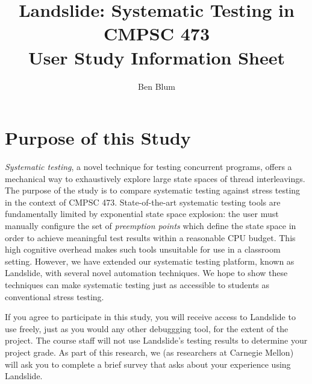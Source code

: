 \documentclass{article}
\begin{document}

\newcommand\classname{CMPSC 473}
\title{\bf Landslide: Systematic Testing in \classname \\ User Study Information Sheet}
\author{Ben Blum}
\date{}
\maketitle

\section{Purpose of this Study}

{\em Systematic testing}, a novel technique for testing concurrent programs, offers a mechanical way to exhaustively explore large state spaces of thread interleavings.
The purpose of the study is to compare systematic testing against stress testing in the context of \classname.
State-of-the-art systematic testing tools are fundamentally limited by exponential state space explosion: the user must manually configure the set of {\em preemption points} which define the state space in order to achieve meaningful test results within a reasonable CPU budget.
This high cognitive overhead makes such tools unsuitable for use in a classroom setting.
However, we have extended our systematic testing platform, known as Landslide, with several novel automation techniques.
We hope to show these techniques can make systematic testing just as accessible to students as conventional stress testing.

If you agree to participate in this study,
you will receive access to Landslide to use freely, just as you would any other debuggging tool, for the extent of the project.
The course staff will not use Landslide's testing results to determine your project grade.
As part of this research, we (as researchers at Carnegie Mellon) will ask you to complete a brief survey that asks about your experience using Landslide.
\end{document}
